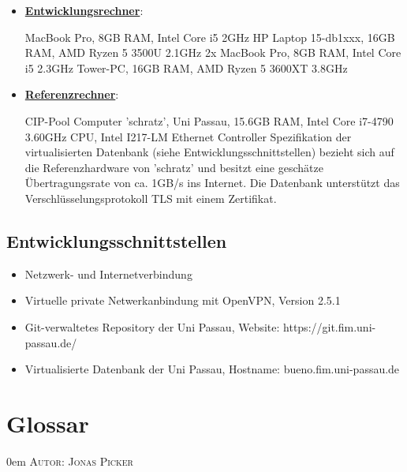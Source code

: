\documentclass{article}
\makeatletter
\newcommand{\sectionauthor}[1]{
	{\parindent 0em \large \scshape Autor: #1 \par \nobreak \vspace*{2em}}
	\@afterheading
}
\makeatother
\begin{document}
\begin{itemize}
\item \underline{\textbf{Entwicklungsrechner}}: 
\begin{flushleft}
MacBook Pro, 8GB RAM, Intel Core i5 2GHz  \linebreak
HP Laptop 15-db1xxx, 16GB RAM, AMD Ryzen 5 3500U 2.1GHz \linebreak
2x MacBook Pro, 8GB RAM, Intel Core i5 2.3GHz \linebreak
Tower-PC, 16GB RAM, AMD Ryzen 5 3600XT 3.8GHz \linebreak
\end{flushleft}
\item \underline{\textbf{Referenzrechner}}:
\begin{flushleft}
CIP-Pool Computer 'schratz', Uni Passau, 15.6GB RAM, Intel Core i7-4790 3.60GHz CPU, Intel I217-LM Ethernet Controller \linebreak
Spezifikation der virtualisierten Datenbank (siehe Entwicklungsschnittstellen) bezieht sich auf die Referenzhardware von 'schratz' und besitzt eine geschätze Übertragungsrate von ca. 1GB/s ins Internet. Die Datenbank unterstützt das Verschlüsselungsprotokoll TLS mit einem Zertifikat. \linebreak
\end{flushleft}
\end{itemize}

\subsection{Entwicklungsschnittstellen}

\begin{itemize}
\item \begin{flushleft} Netzwerk- und Internetverbindung \end{flushleft} 
\item \begin{flushleft} Virtuelle private Netwerkanbindung mit OpenVPN, Version 2.5.1 \end{flushleft} 
\item \begin{flushleft} Git-verwaltetes Repository der Uni Passau, Website: https://git.fim.uni-passau.de/ \end{flushleft} 
\item \begin{flushleft} Virtualisierte Datenbank der Uni Passau, Hostname: bueno.fim.uni-passau.de \end{flushleft}
\end{itemize}

\newpage

\section{Glossar} %
\sectionauthor{Jonas Picker}
\end{document}

